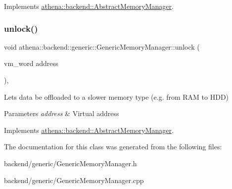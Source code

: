Implements \mbox{\hyperlink{classathena_1_1backend_1_1_abstract_memory_manager_a18562c6f336ff0f7ff800f877696c851}{athena\+::backend\+::\+Abstract\+Memory\+Manager}}.

\mbox{\label{classathena_1_1backend_1_1generic_1_1_generic_memory_manager_a58a2b56a07a96c3cabb7b8fd079b3eae}} 
\subsubsection{\texorpdfstring{unlock()}{unlock()}}
{\footnotesize\ttfamily void athena\+::backend\+::generic\+::\+Generic\+Memory\+Manager\+::unlock (\begin{DoxyParamCaption}\item[{vm\+\_\+word}]{address }\end{DoxyParamCaption})\hspace{0.3cm}{\ttfamily [override]}, {\ttfamily [virtual]}}

Lets data be offloaded to a slower memory type (e.\+g. from R\+AM to H\+DD) 
\begin{DoxyParams}{Parameters}
{\em address} & Virtual address \\
\hline
\end{DoxyParams}


Implements \mbox{\hyperlink{classathena_1_1backend_1_1_abstract_memory_manager_aec859ee3bf6011d8710b2ec4bfc2373e}{athena\+::backend\+::\+Abstract\+Memory\+Manager}}.



The documentation for this class was generated from the following files\+:\begin{DoxyCompactItemize}
\item 
backend/generic/Generic\+Memory\+Manager.\+h\item 
backend/generic/Generic\+Memory\+Manager.\+cpp\end{DoxyCompactItemize}
